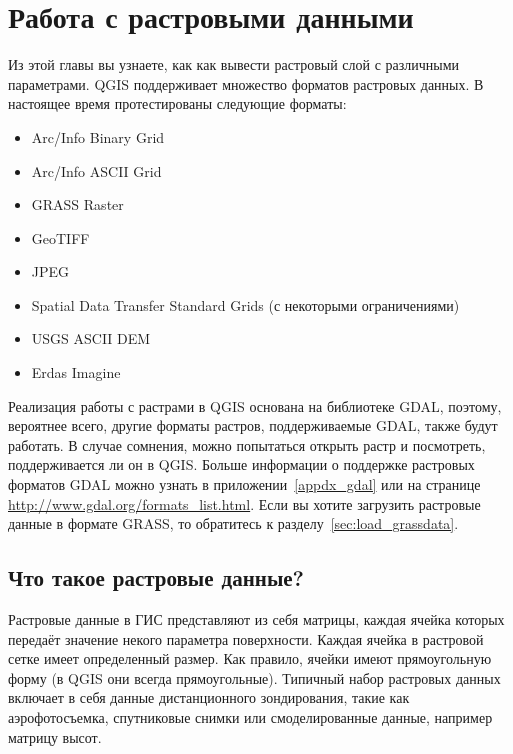 
\chapter{Работа с растровыми данными}\label{label_raster}


Из этой главы вы узнаете, как как вывести растровый слой с различными параметрами.
QGIS поддерживает множество форматов растровых данных. В настоящее время
протестированы следующие форматы:

\begin{itemize}[label=--]
\item Arc/Info Binary Grid
\item Arc/Info ASCII Grid
\item GRASS Raster
\item GeoTIFF
\item JPEG
\item Spatial Data Transfer Standard Grids (с некоторыми ограничениями)
\item USGS ASCII DEM
\item Erdas Imagine
\end{itemize}

Реализация работы с растрами в QGIS основана на библиотеке GDAL, поэтому,
вероятнее всего, другие форматы растров, поддерживаемые GDAL, также будут работать.
В случае сомнения, можно попытаться открыть растр и посмотреть,
поддерживается ли он в QGIS. Больше информации о поддержке растровых
форматов GDAL можно узнать в приложении~\ref{appdx_gdal}
или на странице \url{http://www.gdal.org/formats_list.html}. Если вы хотите
загрузить растровые данные в формате GRASS, то обратитесь к
разделу~\ref{sec:load_grassdata}.

\section{Что такое растровые данные?}\label{label_whatsraster}

Растровые данные в ГИС представляют из себя матрицы, каждая ячейка которых
передаёт значение некого параметра поверхности. Каждая ячейка в
растровой сетке имеет определенный размер. Как правило, ячейки имеют
прямоугольную форму (в QGIS они всегда прямоугольные). Типичный набор
растровых данных включает в себя данные дистанционного зондирования,
такие как аэрофотосъемка, спутниковые снимки или смоделированные данные,
например матрицу высот.

